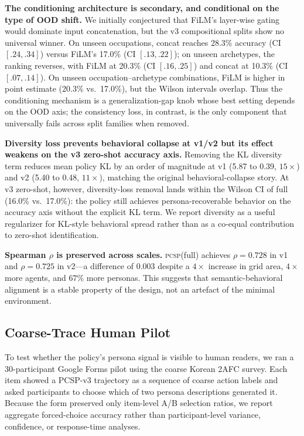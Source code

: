 \documentclass[conference]{IEEEtran}
\newcommand{\PCSP}{\textsc{pcsp}\xspace}
\begin{document}
\textbf{The conditioning architecture is secondary, and conditional on the
type of OOD shift.}
We initially conjectured that FiLM's layer-wise gating would dominate input
concatenation, but the v3 compositional splits show no universal winner.
On unseen occupations, concat reaches 28.3\% accuracy (CI $[.24,.34]$) versus
FiLM's 17.0\% (CI $[.13,.22]$); on unseen archetypes, the ranking reverses,
with FiLM at 20.3\% (CI $[.16,.25]$) and concat at 10.3\% (CI $[.07,.14]$).
On unseen occupation--archetype combinations, FiLM is higher in point estimate
(20.3\% vs.\ 17.0\%), but the Wilson intervals overlap.
Thus the conditioning mechanism is a generalization-gap knob whose best setting
depends on the OOD axis; the consistency loss, in contrast, is the only
component that universally fails across split families when removed.

\textbf{Diversity loss prevents behavioral collapse at v1/v2 but its effect
weakens on the v3 zero-shot accuracy axis.}
Removing the KL diversity term reduces mean policy KL by an order of
magnitude at v1 (5.87 to 0.39, $15\times$) and v2 (5.40 to 0.48, $11\times$),
matching the original behavioral-collapse story.
At v3 zero-shot, however, diversity-loss removal lands within the Wilson CI
of full (16.0\% vs.\ 17.0\%): the policy still achieves persona-recoverable
behavior on the accuracy axis without the explicit KL term.
We report diversity as a useful regularizer for KL-style behavioral spread
rather than as a co-equal contribution to zero-shot identification.

\textbf{Spearman $\rho$ is preserved across scales.}
\PCSP (full) achieves $\rho\!=\!0.728$ in v1 and $\rho\!=\!0.725$ in v2---a
difference of 0.003 despite a $4\times$ increase in grid area, $4\times$ more
agents, and $67\%$ more personas. This suggests that semantic-behavioral
alignment is a stable property of the design, not an artefact of the
minimal environment.

\subsection{Coarse-Trace Human Pilot}
\label{sec:humanpilot}

To test whether the policy's persona signal is visible to human readers, we ran
a 30-participant Google Forms pilot using the coarse Korean 2AFC survey. Each
item showed a PCSP-v3 trajectory as a sequence of coarse action labels and asked
participants to choose which of two persona descriptions generated it. Because
the form preserved only item-level A/B selection ratios, we report aggregate
forced-choice accuracy rather than participant-level variance, confidence, or
response-time analyses.
\end{document}
